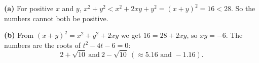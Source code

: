 \textbf{(a)} For positive $x$ and $y$, $x^2+y^2<x^2+2xy+y^2=(x+y)^2=16<28$. So the numbers cannot both be positive.

\textbf{(b)} From $(x+y)^2=x^2+y^2+2xy$ we get $16=28+2xy$, so $xy=-6$. The numbers are the roots of $t^2-4t-6=0$:
\[\boxed{2+\sqrt{10}\ \text{and}\ 2-\sqrt{10}}\ (\approx5.16\text{ and }-1.16).\]
